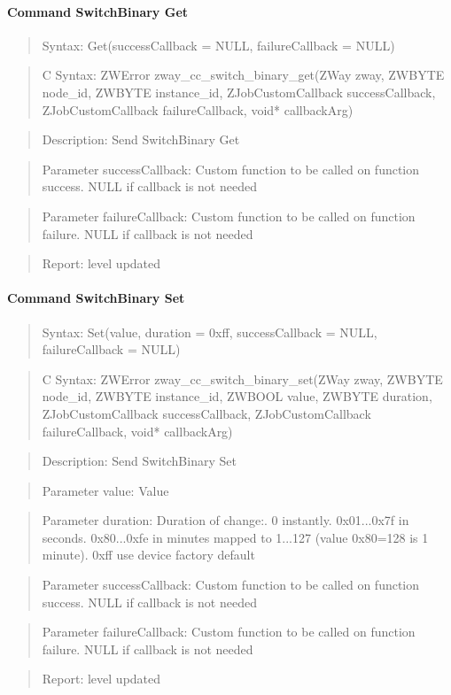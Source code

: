 \paragraph{Command SwitchBinary Get}
\begin{quote}Syntax: Get(successCallback = NULL, failureCallback = NULL)\end{quote}
\begin{quote}C Syntax: ZWError zway\_cc\_switch\_binary\_get(ZWay zway, ZWBYTE node\_id, ZWBYTE instance\_id, ZJobCustomCallback successCallback, ZJobCustomCallback failureCallback, void* callbackArg)\end{quote}
\begin{quote}Description: Send SwitchBinary Get\end{quote}
\begin{quote}Parameter successCallback: Custom function to be called on function success. NULL if callback is not needed\end{quote}
\begin{quote}Parameter failureCallback: Custom function to be called on function failure. NULL if callback is not needed\end{quote}
\begin{quote}Report: level updated\end{quote}

\paragraph{Command SwitchBinary Set}
\begin{quote}Syntax: Set(value, duration = 0xff, successCallback = NULL, failureCallback = NULL)\end{quote}
\begin{quote}C Syntax: ZWError zway\_cc\_switch\_binary\_set(ZWay zway, ZWBYTE node\_id, ZWBYTE instance\_id, ZWBOOL value, ZWBYTE duration, ZJobCustomCallback successCallback, ZJobCustomCallback failureCallback, void* callbackArg)\end{quote}
\begin{quote}Description: Send SwitchBinary Set\end{quote}
\begin{quote}Parameter value: Value\end{quote}
\begin{quote}Parameter duration: Duration of change:. 0 instantly. 0x01...0x7f in seconds. 0x80...0xfe in minutes mapped to 1...127 (value 0x80=128 is 1 minute). 0xff use device factory default\end{quote}
\begin{quote}Parameter successCallback: Custom function to be called on function success. NULL if callback is not needed\end{quote}
\begin{quote}Parameter failureCallback: Custom function to be called on function failure. NULL if callback is not needed\end{quote}
\begin{quote}Report: level updated\end{quote}


